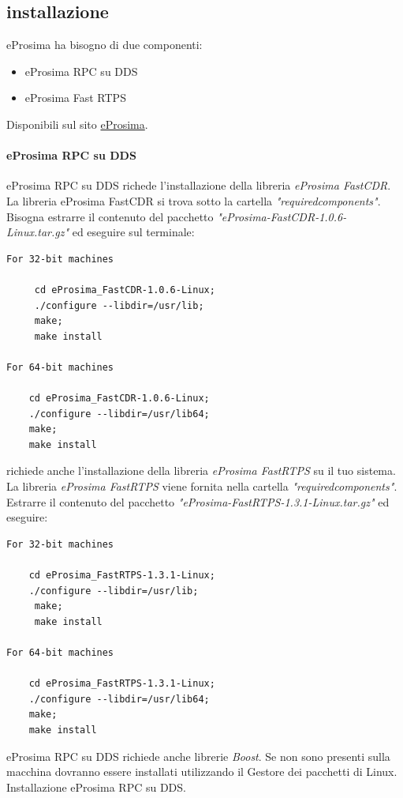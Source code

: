\documentclass[a4paper]{article}
\begin{document}
\subsection{installazione}
eProsima ha bisogno di due componenti:
\begin{itemize}
\item eProsima RPC su DDS
\item eProsima Fast RTPS
\end{itemize}

Disponibili sul sito \href{https://www.eprosima.com/}{eProsima}.
\paragraph{eProsima RPC su DDS}
eProsima RPC su DDS richede l'installazione della libreria \textit{eProsima FastCDR}. La libreria eProsima FastCDR si trova sotto la cartella
\textit{"requiredcomponents"}. Bisogna estrarre il contenuto del pacchetto \textit{"eProsima-FastCDR-1.0.6-Linux.tar.gz"}
ed eseguire sul terminale:
\begin{verbatim}
For 32-bit machines

     cd eProsima_FastCDR-1.0.6-Linux;
     ./configure --libdir=/usr/lib;
     make; 
     make install
     
For 64-bit machines

    cd eProsima_FastCDR-1.0.6-Linux; 
    ./configure --libdir=/usr/lib64;
    make;
    make install
\end{verbatim}
richiede anche l'installazione della libreria \textit{eProsima FastRTPS} su
il tuo sistema. La libreria \textit{eProsima FastRTPS} viene fornita nella cartella
\textit{"requiredcomponents"}. Estrarre il contenuto del pacchetto
\textit{"eProsima-FastRTPS-1.3.1-Linux.tar.gz"} ed eseguire:

\begin{verbatim}
For 32-bit machines

    cd eProsima_FastRTPS-1.3.1-Linux; 
    ./configure --libdir=/usr/lib;
     make; 
     make install

For 64-bit machines

    cd eProsima_FastRTPS-1.3.1-Linux;
    ./configure --libdir=/usr/lib64;
    make;
    make install

\end{verbatim}

eProsima RPC su DDS richiede anche librerie \textit{Boost}. Se non sono presenti sulla macchina dovranno essere installati utilizzando il  Gestore dei pacchetti di Linux.
Installazione  eProsima RPC su DDS.
\end{document}
